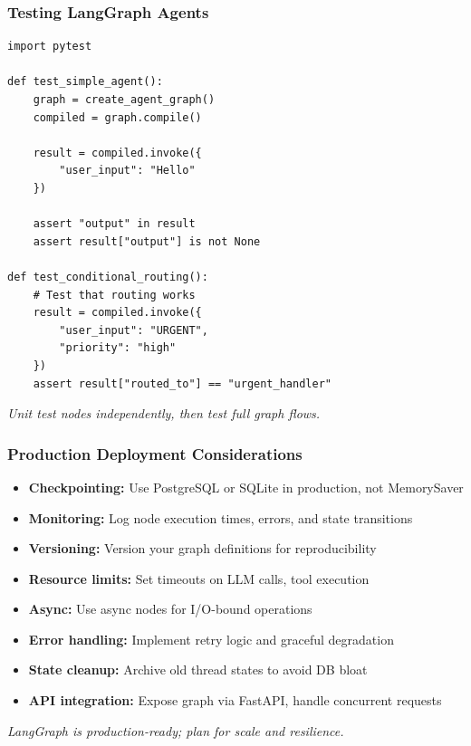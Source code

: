 \documentclass[aspectratio=169,11pt]{beamer}
\begin{document}
\begin{frame}[fragile]
\frametitle{Testing LangGraph Agents}
\begin{lstlisting}
import pytest

def test_simple_agent():
    graph = create_agent_graph()
    compiled = graph.compile()

    result = compiled.invoke({
        "user_input": "Hello"
    })

    assert "output" in result
    assert result["output"] is not None

def test_conditional_routing():
    # Test that routing works
    result = compiled.invoke({
        "user_input": "URGENT",
        "priority": "high"
    })
    assert result["routed_to"] == "urgent_handler"
\end{lstlisting}

\vspace{10pt}
\textit{Unit test nodes independently, then test full graph flows.}
\end{frame}

\begin{frame}
\frametitle{Production Deployment Considerations}
\begin{itemize}
    \setlength{\itemsep}{1pt}
  \item \textbf{Checkpointing:} Use PostgreSQL or SQLite in production, not MemorySaver
  \item \textbf{Monitoring:} Log node execution times, errors, and state transitions
  \item \textbf{Versioning:} Version your graph definitions for reproducibility
  \item \textbf{Resource limits:} Set timeouts on LLM calls, tool execution
  \item \textbf{Async:} Use async nodes for I/O-bound operations
  \item \textbf{Error handling:} Implement retry logic and graceful degradation
  \item \textbf{State cleanup:} Archive old thread states to avoid DB bloat
  \item \textbf{API integration:} Expose graph via FastAPI, handle concurrent requests
\end{itemize}

\vspace{15pt}
\textit{LangGraph is production-ready; plan for scale and resilience.}
\end{frame}
\end{document}
